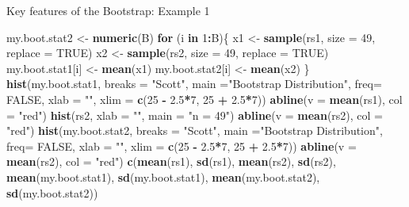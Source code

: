 \documentclass[
  ignorenonframetext,
]{beamer}
\newenvironment{Shaded}{\begin{snugshade}}{\end{snugshade}}
\newcommand{\AttributeTok}[1]{\textcolor[rgb]{0.13,0.29,0.53}{#1}}
\newcommand{\ConstantTok}[1]{\textcolor[rgb]{0.56,0.35,0.01}{#1}}
\newcommand{\ControlFlowTok}[1]{\textcolor[rgb]{0.13,0.29,0.53}{\textbf{#1}}}
\newcommand{\DecValTok}[1]{\textcolor[rgb]{0.00,0.00,0.81}{#1}}
\newcommand{\FloatTok}[1]{\textcolor[rgb]{0.00,0.00,0.81}{#1}}
\newcommand{\FunctionTok}[1]{\textcolor[rgb]{0.13,0.29,0.53}{\textbf{#1}}}
\newcommand{\NormalTok}[1]{#1}
\newcommand{\OtherTok}[1]{\textcolor[rgb]{0.56,0.35,0.01}{#1}}
\newcommand{\SpecialCharTok}[1]{\textcolor[rgb]{0.81,0.36,0.00}{\textbf{#1}}}
\newcommand{\StringTok}[1]{\textcolor[rgb]{0.31,0.60,0.02}{#1}}
\begin{document}
\begin{frame}[fragile]{Key features of the Bootstrap: Example 1}
\begin{Shaded}
\begin{Highlighting}[]
\NormalTok{my.boot.stat2 }\OtherTok{\textless{}{-}} \FunctionTok{numeric}\NormalTok{(B)}
\ControlFlowTok{for}\NormalTok{ (i }\ControlFlowTok{in} \DecValTok{1}\SpecialCharTok{:}\NormalTok{B)\{}
\NormalTok{  x1 }\OtherTok{\textless{}{-}} \FunctionTok{sample}\NormalTok{(rs1, }\AttributeTok{size =} \DecValTok{49}\NormalTok{, }\AttributeTok{replace =} \ConstantTok{TRUE}\NormalTok{) }
\NormalTok{  x2 }\OtherTok{\textless{}{-}} \FunctionTok{sample}\NormalTok{(rs2, }\AttributeTok{size =} \DecValTok{49}\NormalTok{, }\AttributeTok{replace =} \ConstantTok{TRUE}\NormalTok{) }
\NormalTok{  my.boot.stat1[i] }\OtherTok{\textless{}{-}} \FunctionTok{mean}\NormalTok{(x1)}
\NormalTok{  my.boot.stat2[i] }\OtherTok{\textless{}{-}} \FunctionTok{mean}\NormalTok{(x2)}
\NormalTok{\}}
\FunctionTok{hist}\NormalTok{(my.boot.stat1, }\AttributeTok{breaks =} \StringTok{"Scott"}\NormalTok{,  }\AttributeTok{main =}\StringTok{"Bootstrap Distribution"}\NormalTok{, }\AttributeTok{freq=} \ConstantTok{FALSE}\NormalTok{, }\AttributeTok{xlab =} \StringTok{""}\NormalTok{, }
\AttributeTok{xlim =} \FunctionTok{c}\NormalTok{(}\DecValTok{25} \SpecialCharTok{{-}} \FloatTok{2.5}\SpecialCharTok{*}\DecValTok{7}\NormalTok{, }\DecValTok{25} \SpecialCharTok{+} \FloatTok{2.5}\SpecialCharTok{*}\DecValTok{7}\NormalTok{))}
\FunctionTok{abline}\NormalTok{(}\AttributeTok{v =} \FunctionTok{mean}\NormalTok{(rs1), }\AttributeTok{col =} \StringTok{"red"}\NormalTok{)}
\FunctionTok{hist}\NormalTok{(rs2, }\AttributeTok{xlab =} \StringTok{""}\NormalTok{, }\AttributeTok{main =} \StringTok{"n = 49"}\NormalTok{)}
\FunctionTok{abline}\NormalTok{(}\AttributeTok{v =} \FunctionTok{mean}\NormalTok{(rs2), }\AttributeTok{col =} \StringTok{"red"}\NormalTok{)}
\FunctionTok{hist}\NormalTok{(my.boot.stat2, }\AttributeTok{breaks =} \StringTok{"Scott"}\NormalTok{,  }\AttributeTok{main =}\StringTok{"Bootstrap Distribution"}\NormalTok{, }\AttributeTok{freq=} \ConstantTok{FALSE}\NormalTok{, }\AttributeTok{xlab =} \StringTok{""}\NormalTok{, }
\AttributeTok{xlim =} \FunctionTok{c}\NormalTok{(}\DecValTok{25} \SpecialCharTok{{-}} \FloatTok{2.5}\SpecialCharTok{*}\DecValTok{7}\NormalTok{, }\DecValTok{25} \SpecialCharTok{+} \FloatTok{2.5}\SpecialCharTok{*}\DecValTok{7}\NormalTok{))}
\FunctionTok{abline}\NormalTok{(}\AttributeTok{v =} \FunctionTok{mean}\NormalTok{(rs2), }\AttributeTok{col =} \StringTok{"red"}\NormalTok{)}
\FunctionTok{c}\NormalTok{(}\FunctionTok{mean}\NormalTok{(rs1), }\FunctionTok{sd}\NormalTok{(rs1), }\FunctionTok{mean}\NormalTok{(rs2), }\FunctionTok{sd}\NormalTok{(rs2), }
  \FunctionTok{mean}\NormalTok{(my.boot.stat1), }\FunctionTok{sd}\NormalTok{(my.boot.stat1), }\FunctionTok{mean}\NormalTok{(my.boot.stat2), }\FunctionTok{sd}\NormalTok{(my.boot.stat2))}
\end{Highlighting}
\end{Shaded}

\normalsize
\end{frame}
\end{document}
